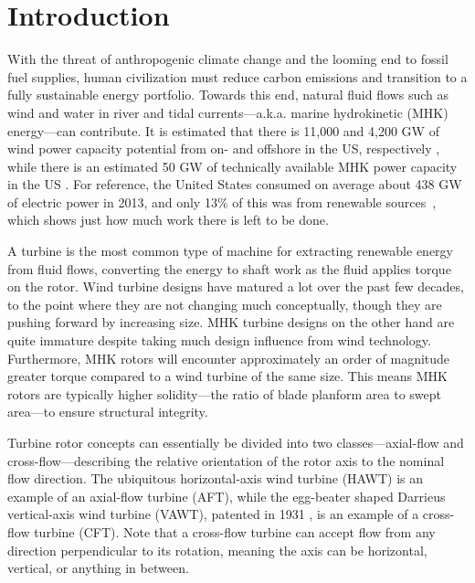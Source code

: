 \chapter{Introduction}

With the threat of anthropogenic climate change and the looming end to fossil
fuel supplies, human civilization must reduce carbon emissions \cite{Hansen2013}
and transition to a fully sustainable energy portfolio. Towards this end,
natural fluid flows such as wind and water in river and tidal currents---a.k.a.
marine hydrokinetic (MHK) energy---can contribute. It is estimated that there is
11,000 and 4,200 GW of wind power capacity potential from on- and offshore in
the US, respectively \cite{Lopez2012}, while there is an estimated 50 GW of
technically available MHK power capacity in the US \cite{Haas2011, Ravens2012,
Haas2013}. For reference, the United States consumed on average about 438 GW of
electric power in 2013, and only 13\% of this was from renewable
sources~\cite{EIA2015}, which shows just how much work there is left to be done.

A turbine is the most common type of machine for extracting renewable energy
from fluid flows, converting the energy to shaft work as the fluid applies
torque on the rotor. Wind turbine designs have matured a lot over the past few
decades, to the point where they are not changing much conceptually, though they
are pushing forward by increasing size. MHK turbine designs on the other hand
are quite immature despite taking much design influence from wind technology.
Furthermore, MHK rotors will encounter approximately an order of magnitude
greater torque compared to a wind turbine of the same size. This means MHK
rotors are typically higher solidity---the ratio of blade planform area to swept
area---to ensure structural integrity.

Turbine rotor concepts can essentially be divided into two classes---axial-flow
and cross-flow---describing the relative orientation of the rotor axis to the
nominal flow direction. The ubiquitous horizontal-axis wind turbine (HAWT) is an
example of an axial-flow turbine (AFT), while the egg-beater shaped Darrieus
vertical-axis wind turbine (VAWT), patented in 1931 \cite{Darrieus1931}, is an
example of a cross-flow turbine (CFT). Note that a cross-flow turbine can accept
flow from any direction perpendicular to its rotation, meaning the axis can be
horizontal, vertical, or anything in between.

